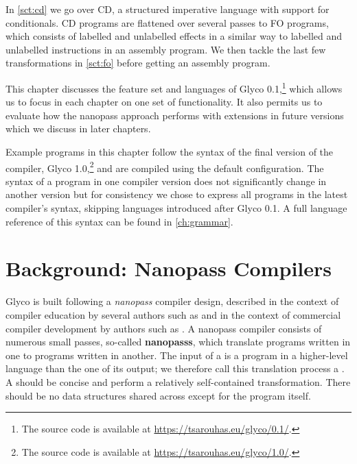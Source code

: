 \documentclass[main.tex]{subfiles}
\begin{document}
In \cref{sct:cd} we go over CD, a structured imperative language with support for conditionals. CD programs are flattened over several passes to FO programs, which consists of labelled and unlabelled effects in a similar way to labelled and unlabelled instructions in an assembly program. We then tackle the last few transformations in \cref{sct:fo} before getting an assembly program.


This chapter discusses the feature set and languages of Glyco 0.1,\footnote{The source code is available at \url{https://tsarouhas.eu/glyco/0.1/}.} which allows us to focus in each chapter on one set of functionality. It also permits us to evaluate how the nanopass approach performs with extensions in future versions which we discuss in later chapters.

Example programs in this chapter follow the syntax of the final version of the compiler, Glyco 1.0,\footnote{The source code is available at \url{https://tsarouhas.eu/glyco/1.0/}.} and are compiled using the default configuration. The syntax of a program in one compiler version does not significantly change in another version but for consistency we chose to express all programs in the latest compiler's syntax, skipping languages introduced after Glyco 0.1. A full language reference of this syntax can be found in \cref{ch:grammar}. 

\section{Background: Nanopass Compilers} \label{sct:nanopass}
Glyco is built following a \emph{nanopass} compiler design, described in the context of compiler education by several authors such as \cite{educomp} and in the context of commercial compiler development by authors such as \cite{commcomp}.  A nanopass compiler consists of numerous small passes, so-called \textbf{\glspl{nanopass}}, which translate programs written in one \textbf{} to programs written in another. The input of a  is a program in a higher-level language than the one of its output; we therefore call this translation process a \textbf{}. A  should be concise and perform a relatively self-contained transformation. There should be no data structures shared across  except for the program itself.
\end{document}
